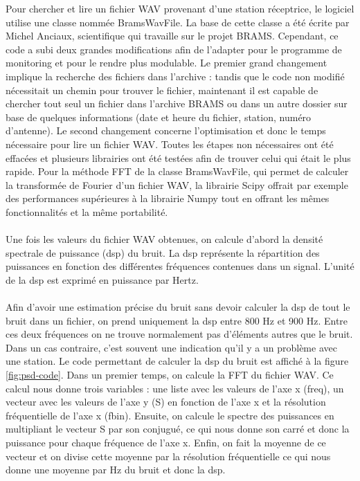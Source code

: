 \documentclass[11pt]{article}
\begin{document}
Pour chercher et lire un fichier WAV provenant d'une station réceptrice, le logiciel utilise une classe nommée BramsWavFile.
La base de cette classe a été écrite par Michel Anciaux, scientifique qui travaille sur le projet BRAMS.
Cependant, ce code a subi deux grandes modifications afin de l'adapter pour le programme de monitoring et pour le rendre plus modulable.
Le premier grand changement implique la recherche des fichiers dans l'archive : tandis que le code non modifié nécessitait un chemin pour trouver le fichier, maintenant il est capable de chercher tout seul un fichier dans l'archive BRAMS ou dans un autre dossier sur base de quelques informations (date et heure du fichier, station, numéro d'antenne).
Le second changement concerne l'optimisation et donc le temps nécessaire pour lire un fichier WAV.
Toutes les étapes non nécessaires ont été effacées et plusieurs librairies ont été testées afin de trouver celui qui était le plus rapide.
Pour la méthode FFT de la classe BramsWavFile, qui permet de calculer la transformée de Fourier d'un fichier WAV, la librairie Scipy offrait par exemple des performances supérieures à la librairie Numpy tout en offrant les mêmes fonctionnalités et la même portabilité.\\
\\
Une fois les valeurs du fichier WAV obtenues, on calcule d'abord la densité spectrale de puissance (dsp) du bruit.
La dsp représente la répartition des puissances en fonction des différentes fréquences contenues dans un signal.
L'unité de la dsp est exprimé en puissance par Hertz.\\
\\
Afin d'avoir une estimation précise du bruit sans devoir calculer la dsp de tout le bruit dans un fichier, on prend uniquement la dsp entre 800 Hz et 900 Hz.
Entre ces deux fréquences on ne trouve normalement pas d'éléments autres que le bruit.
Dans un cas contraire, c'est souvent une indication qu'il y a un problème avec une station.
Le code permettant de calculer la dsp du bruit est affiché à la figure \ref{fig:psd-code}.
Dans un premier temps, on calcule la FFT du fichier WAV.
Ce calcul nous donne trois variables : une liste avec les valeurs de l'axe x (freq), un vecteur avec les valeurs de l'axe y (S) en fonction de l'axe x et la résolution fréquentielle de l'axe x (fbin).
Ensuite, on calcule le spectre des puissances en multipliant le vecteur S par son conjugué, ce qui nous donne son carré et donc la puissance pour chaque fréquence de l'axe x.
Enfin, on fait la moyenne de ce vecteur et on divise cette moyenne par la résolution fréquentielle ce qui nous donne une moyenne par Hz du bruit et donc la dsp.\\
\end{document}
